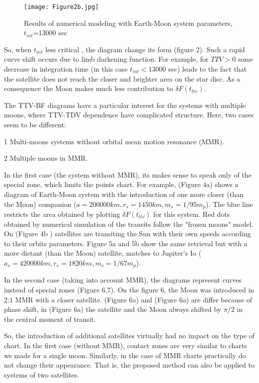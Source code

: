 \documentclass[12pt]{article}
\begin{document}
\begin{figure}[h]
\centering
\texttt{[image: Figure2b.jpg]}
\caption{Results of numerical modeling with Earth-Moon system parameters, $t_{int}$=13000 sec}
\centering
\label{fig:2b}
\end{figure}

So, when $t_{int}$ less critical , the diagram change its form (figure 2). Such a rapid curve shift occurs due to limb darkening function. For example, for $TTV>0$ some decrease in integration time (in this case $t_{int}<$13000 sec) leads to the fact that the satellite does not reach the closer and brighter area on the star disc. As a consequence the Moon makes much less contribution to $\delta F(t_{ttv})$.

The TTV-BF diagrams have a particular interest for the systems with multiple moons, where TTV-TDV dependence have complicated structure. Here, two cases seem to be different:

1 Multi-moons systems without orbital mean motion resonance (MMR).

2 Multiple moons in MMR.

In the first case (the system without MMR), its makes sense to speak only of the special zone, which limits the points chart. For example, (Figure 4a) shows a diagram of Earth-Moon system with the introduction of one more closer (than the Moon) companion ($a =200000 km, r_s =1450 km, m_s=1/95 m_p$). The blue line restricts the area obtained by plotting $\delta F(t_{ttv})$ for this system. Red dots obtained by numerical simulation of the transits follow the "frozen moons" model. On (Figure 4b )  satellites are transiting the Sun with their own speeds according to their orbits parameters. Figure 5a and 5b show the same retrieval but with a more distant (than the Moon) satellite, matches to Jupiter's Io ($a_s =420000 km, r_s=1820 km, m_s=1/67 m_p$).

In the second case (taking into account MMR), the diagrams represent curves instead of special zones (Figure 6,7). On the figure 6, the Moon was introduced in 2:1 MMR with a closer satellite. (Figure 6a) and (Figure 6a) are differ because of phase shift, in (Figure 6a) the satellite and the Moon always shifted by $\pi/2$ in the central moment of transit. 

So, the introduction of additional satellites virtually had no impact on the type of chart. In the first case (without MMR), contact zones are very similar to charts we made for a single moon.
Similarly, in the case of MMR charts practically do not change their appearance. That is, the proposed method can also be applied to systems of two satellites.
%
\end{document}
